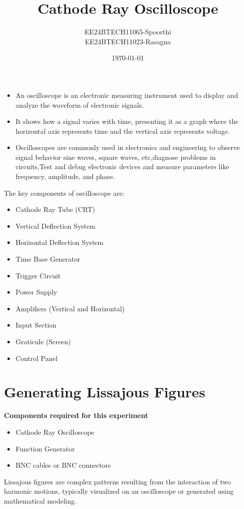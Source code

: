\documentclass[a4paper,12pt]{article}
\numberwithin{equation}{section} %
\begin{document}
\title{\textbf{Cathode Ray Oscilloscope}}
\author{EE24BTECH11065-Spoorthi\\EE24BTECH11023-Rasagna}
\date{\today}
\maketitle
\begin{itemize}
\item An oscilloscope is an electronic measuring instrument used to display and analyze the waveform of electronic signals.
\item It shows how a signal varies with time, presenting it as a graph where the horizontal axis represents time and the vertical axis represents voltage.
\item Oscilloscopes are commonly used in electronics and engineering to observe signal behavior sine waves, square waves, etc,diagnose problems in circuits,Test and debug electronic devices and measure parameters like frequency, amplitude, and phase.
\end{itemize}
The key components of oscilloscope are:
\begin{itemize}
\item Cathode Ray Tube (CRT)
\item Vertical Deflection System
\item Horizontal Deflection System
\item Time Base Generator
\item Trigger Circuit
\item Power Supply
\item Amplifiers (Vertical and Horizontal)
\item Input Section
\item Graticule (Screen)
\item Control Panel
\end{itemize}
\section*{Generating Lissajous Figures}
\textbf{Components required for this experiment}
\begin{itemize}
    \item Cathode Ray Oscilloscope
    \item Function Generator
    \item BNC cables or BNC connectors
\end{itemize}
Lissajous figures are complex patterns resulting from the interaction of two harmonic motions, typically visualized on an oscilloscope or generated using mathematical modeling.
\end{document}
